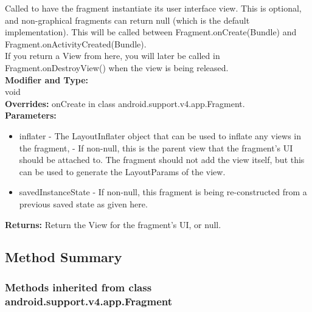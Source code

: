 Called to have the fragment instantiate its user interface view. This is optional, and non-graphical fragments can return null (which is the default implementation). This will be called between Fragment.onCreate(Bundle) and Fragment.onActivityCreated(Bundle).\\

If you return a View from here, you will later be called in Fragment.onDestroyView() when the view is being released.\\

\textbf{Modifier and Type:}\\
\tab void\\

\textbf{Overrides:}
\tab    onCreate in class android.support.v4.app.Fragment.\\

\textbf{Parameters:}
\begin{itemize}
\item inflater - The LayoutInflater object that can be used to inflate any views in the fragment,
\itemcontainer - If non-null, this is the parent view that the fragment's UI should be attached to. The fragment should not add the view itself, but this can be used to generate the LayoutParams of the view.
\item savedInstanceState - If non-null, this fragment is being re-constructed from a previous saved state as given here.
\end{itemize}

\textbf{Returns:}
\tab   Return the View for the fragment's UI, or null.\\


\subsection{Method Summary}

\subsubsection{Methods inherited from class android.support.v4.app.Fragment}

